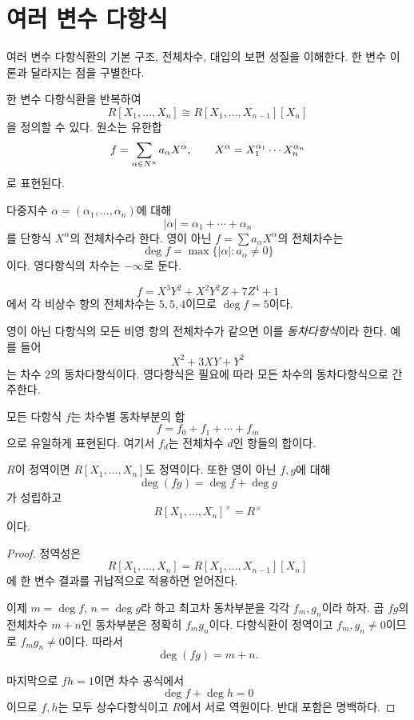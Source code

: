 \section{여러 변수 다항식}
\label{sec:several-variables}

\begin{learninggoal}
여러 변수 다항식환의 기본 구조, 전체차수, 대입의 보편 성질을 이해한다. 한 변수 이론과 달라지는 점을 구별한다.
\end{learninggoal}

한 변수 다항식환을 반복하여
\[
  R[X_1,\dots,X_n]
  \cong R[X_1,\dots,X_{n-1}][X_n]
\]
을 정의할 수 있다. 원소는 유한합
\[
  f=\sum_{\alpha\in N^n}a_\alpha X^\alpha,
  \qquad
  X^\alpha=X_1^{\alpha_1}\cdots X_n^{\alpha_n}
\]
로 표현된다.

\begin{definition}
다중지수 $\alpha=(\alpha_1,\dots,\alpha_n)$에 대해
\[
  |\alpha|=\alpha_1+\cdots+\alpha_n
\]
를 단항식 $X^\alpha$의 전체차수라 한다. 영이 아닌 $f=\sum a_\alpha X^\alpha$의 전체차수는
\[
  \deg f=\max\{|\alpha|:a_\alpha\ne0\}
\]
이다. 영다항식의 차수는 $-\infty$로 둔다.
\end{definition}

\begin{example}
\[
 f=X^3Y^2+X^2Y^2Z+7Z^4+1
\]
에서 각 비상수 항의 전체차수는 $5,5,4$이므로 $\deg f=5$이다.
\end{example}

\begin{definition}
영이 아닌 다항식의 모든 비영 항의 전체차수가 같으면 이를 \emph{동차다항식}이라 한다. 예를 들어
\[
  X^2+3XY+Y^2
\]
는 차수 $2$의 동차다항식이다. 영다항식은 필요에 따라 모든 차수의 동차다항식으로 간주한다.
\end{definition}

모든 다항식 $f$는 차수별 동차부분의 합
\[
  f=f_0+f_1+\cdots+f_m
\]
으로 유일하게 표현된다. 여기서 $f_d$는 전체차수 $d$인 항들의 합이다.

\begin{proposition}
$R$이 정역이면 $R[X_1,\dots,X_n]$도 정역이다. 또한 영이 아닌 $f,g$에 대해
\[
 \deg(fg)=\deg f+\deg g
\]
가 성립하고
\[
 R[X_1,\dots,X_n]^\times=R^\times
\]
이다.
\end{proposition}

\begin{proof}
정역성은
\[
 R[X_1,\dots,X_n]
 =R[X_1,\dots,X_{n-1}][X_n]
\]
에 한 변수 결과를 귀납적으로 적용하면 얻어진다.

이제 $m=\deg f$, $n=\deg g$라 하고 최고차 동차부분을 각각 $f_m,g_n$이라 하자. 곱 $fg$의 전체차수 $m+n$인 동차부분은 정확히 $f_mg_n$이다. 다항식환이 정역이고 $f_m,g_n\ne0$이므로 $f_mg_n\ne0$이다. 따라서
\[
  \deg(fg)=m+n.
\]

마지막으로 $fh=1$이면 차수 공식에서
\[
  \deg f+\deg h=0
\]
이므로 $f,h$는 모두 상수다항식이고 $R$에서 서로 역원이다. 반대 포함은 명백하다.
\end{proof}

